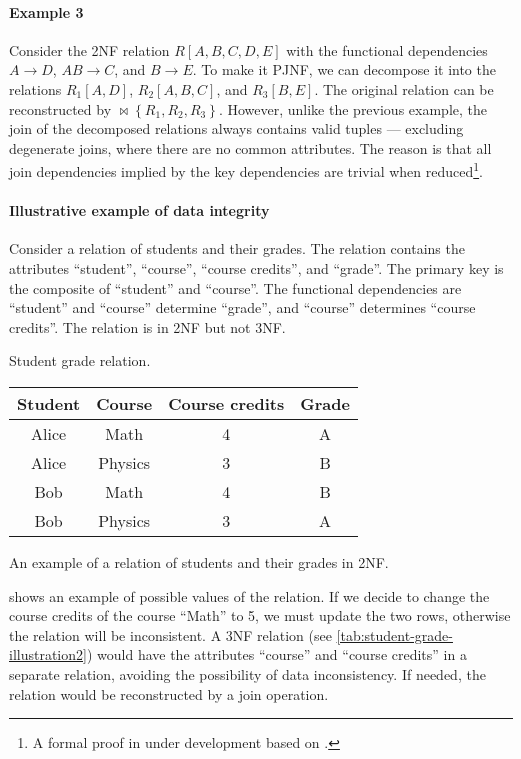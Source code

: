 \paragraph{Example 3}  Consider the 2NF relation $R[A, B, C, D, E]$ with the functional
dependencies $A \to D$, $AB \to C$, and $B \to E$.  To make it PJNF, we can decompose it
into the relations $R_1[A, D]$, $R_2[A, B, C]$, and $R_3[B, E]$.  The original relation can
be reconstructed by $\bowtie \left\{ R_1, R_2, R_3 \right\}$.  However, unlike the
previous example, the join of the decomposed relations always contains valid tuples
--- excluding degenerate joins, where there are no common attributes.
The reason is that all join dependencies implied by the key dependencies are trivial when
reduced\footnote{\color{red}A formal proof in under development based on .}.

\paragraph{Illustrative example of data integrity}  Consider a relation of students and
their grades.  The relation contains the attributes ``student'', ``course'', ``course
credits'', and ``grade''.  The primary key is the composite of ``student'' and ``course''.
The functional dependencies are ``student'' and ``course'' determine ``grade'', and
``course'' determines ``course credits''.  The relation is in 2NF but not 3NF.

\begin{tablebox}[label=tab:student-grade-illustration]{Student grade relation.}
  \centering
  \begin{tabular}{cccc}
    \toprule
    \textbf{Student} & \textbf{Course} & \textbf{Course credits} & \textbf{Grade} \\
    \midrule
    Alice & Math & 4 & A \\
    Alice & Physics & 3 & B \\
    Bob & Math & 4 & B \\
    Bob & Physics & 3 & A \\
    \bottomrule
  \end{tabular}
  \tcblower
  An example of a relation of students and their grades in 2NF.
\end{tablebox}

 shows an example of possible values of the relation.
If we decide to change the course credits of the course ``Math'' to 5, we must update the
two rows, otherwise the relation will be inconsistent.  A 3NF relation (see
\cref{tab:student-grade-illustration2}) would have the attributes ``course'' and ``course
credits'' in a separate relation, avoiding the possibility of data inconsistency.  If
needed, the relation would be reconstructed by a join operation.

